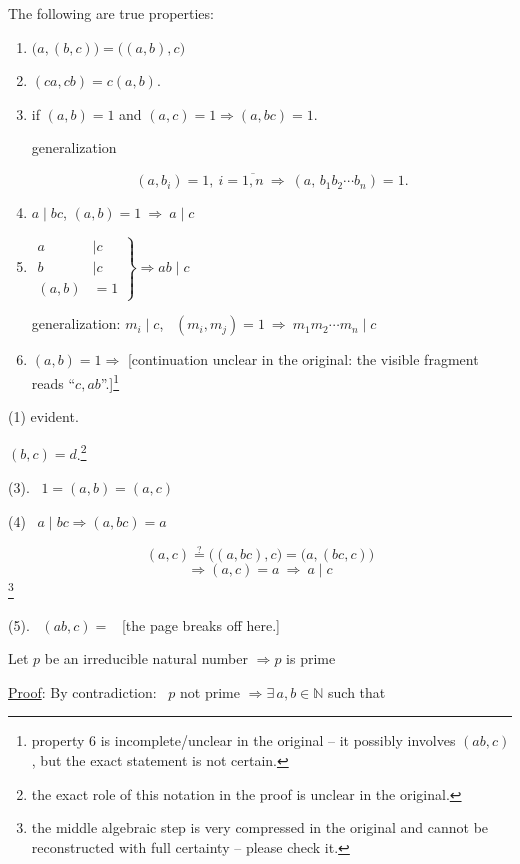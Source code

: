 \noindent The following are true properties:

\begin{enumerate}
\item[1.] $\big(a,(b,c)\big) = \big((a,b),c\big)$
\item[2.] $(ca,cb) = c(a,b)$.
\item[3.] if $(a,b)=1$ and $(a,c)=1 \Rightarrow (a,bc)=1$.

\noindent generalization

\[
(a,b_i)=1,\ i=\overline{1,n} \ \Rightarrow \ (a,\,b_1b_2\cdots b_n)=1.
\]

\item[4.] $a\mid bc$, $(a,b)=1 \ \Rightarrow \ a\mid c$

\item[5.] $\left.\begin{aligned} a&\mid c\\ b&\mid c\\ (a,b)&=1\end{aligned}\right\} \Rightarrow ab\mid c$

\noindent generalization: \quad $m_i\mid c$, \ $(m_i,m_j)=1 \ \Rightarrow \ m_1m_2\cdots m_n\mid c$

\item[6.] $(a,b)=1 \Rightarrow$ [continuation unclear in the original: the visible fragment reads ``$c,ab$''.]\footnote{property 6 is incomplete/unclear in the original -- it possibly involves $(ab,c)$, but the exact statement is not certain.}
\end{enumerate}

\bigskip
\noindent (1) evident.

\noindent $(b,c)=d$.\footnote{the exact role of this notation in the proof is unclear in the original.}

\bigskip
\noindent (3). \ $1=(a,b)=(a,c)$

\bigskip
\noindent (4) \ $a\mid bc \Rightarrow (a,bc)=a$

\[
(a,c) \overset{?}{=} \big((a,bc),c\big) = \big(a,(bc,c)\big)
\]
\[
\Rightarrow (a,c)=a \ \Rightarrow \ a\mid c
\]
\noindent\footnote{the middle algebraic step is very compressed in the original and cannot be reconstructed with full certainty -- please check it.}

\bigskip
\noindent (5). \ $(ab,c)=$ \ [the page breaks off here.]

\bigskip
\noindent Let $p$ be an irreducible natural number $\Rightarrow p$ is prime

\noindent\underline{Proof}: By contradiction: \ $p$ not prime $\Rightarrow \exists\,a,b\in\mathbb{N}$ such that

